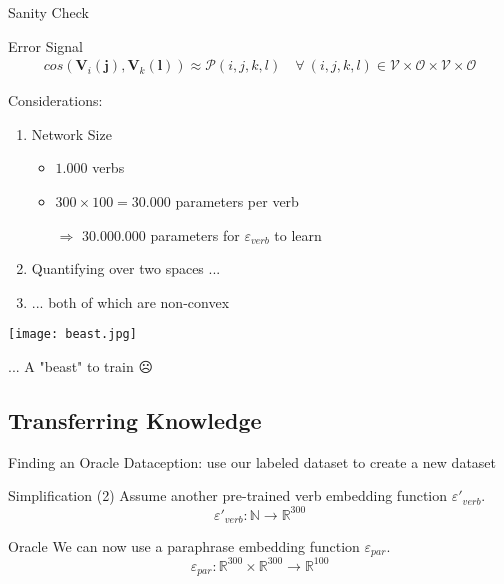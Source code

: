\documentclass{beamer}
\begin{document}
\begin{frame}{Sanity Check}
\begin{block}{Error Signal}
\begin{align*}
cos(\pmb{V}_i(\pmb{j}), \pmb{V}_k(\pmb{l})) \approx \mathcal{P}(i,j,k,l) 
\quad
\forall \ (i,j,k,l) \in \mathcal{V} \times \mathcal{O} \times \mathcal{V} \times \mathcal{O}
\end{align*}
\end{block}

\pause
Considerations:
\begin{enumerate}
\item Network Size\\
\begin{itemize}
\item $1.000$ verbs
\item $300 \times 100 = 30.000$ parameters per verb
\item[$\Rightarrow$]  \alert{ $ 30.000.000 $ parameters} for $\varepsilon_{verb}$ to learn
\end{itemize}
\pause
\item Quantifying over \alert{two spaces} ...
\pause
\item ... both of which are \alert{non-convex}
\end{enumerate}
\end{frame}

\begin{frame}[standout]
\texttt{[image: beast.jpg]}

... A "beast" to train {\DejaSans ☹} 
\end{frame}


\subsection{Transferring Knowledge}

\begin{frame}{Finding an Oracle}
Dataception: use our labeled dataset to create a new dataset

\pause
\begin{block}{Simplification (2)}
Assume another pre-trained \alert{verb embedding function} $\varepsilon '_{verb}$.
  	\[
  	\varepsilon '_{verb}: \mathbb{N} \to \mathbb{R}^{300}
  	\]
\end{block}

\pause
\begin{block}{Oracle}
We can now use a \alert{paraphrase embedding function} $\varepsilon_{par}$.
	\[
	\varepsilon_{par}: \mathbb{R}^{300} \times \mathbb{R}^{300} \to \mathbb{R}^{100}
	\]
\end{block}
\end{frame}
\end{document}
